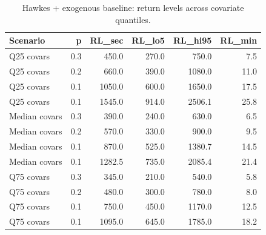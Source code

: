 \begin{table}
\caption{Hawkes + exogenous baseline: return levels across covariate quantiles.}
\label{tab:hawkes_exog_rl}
\begin{tabular}{lrrrrr}
\toprule
Scenario & p & RL_sec & RL_lo5 & RL_hi95 & RL_min \\
\midrule
Q25 covars & 0.3 & 450.0 & 270.0 & 750.0 & 7.5 \\
Q25 covars & 0.2 & 660.0 & 390.0 & 1080.0 & 11.0 \\
Q25 covars & 0.1 & 1050.0 & 600.0 & 1650.0 & 17.5 \\
Q25 covars & 0.1 & 1545.0 & 914.0 & 2506.1 & 25.8 \\
Median covars & 0.3 & 390.0 & 240.0 & 630.0 & 6.5 \\
Median covars & 0.2 & 570.0 & 330.0 & 900.0 & 9.5 \\
Median covars & 0.1 & 870.0 & 525.0 & 1380.7 & 14.5 \\
Median covars & 0.1 & 1282.5 & 735.0 & 2085.4 & 21.4 \\
Q75 covars & 0.3 & 345.0 & 210.0 & 540.0 & 5.8 \\
Q75 covars & 0.2 & 480.0 & 300.0 & 780.0 & 8.0 \\
Q75 covars & 0.1 & 750.0 & 450.0 & 1170.0 & 12.5 \\
Q75 covars & 0.1 & 1095.0 & 645.0 & 1785.0 & 18.2 \\
\bottomrule
\end{tabular}
\end{table}
